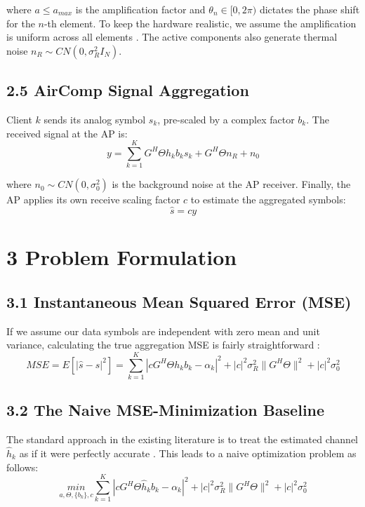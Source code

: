 \documentclass[10pt,twocolumn]{article}
\begin{document}
where $a\leq a_{max}$ is the amplification factor and $\theta _{n}\in [0,2\pi )$ dictates the phase shift for the $n$-th element. To keep the hardware realistic, we assume the amplification is uniform across all elements  \parencite{guangxu_zhu_8807c15e}. The active components also generate thermal noise $n_{R}\sim CN(0,\sigma _{R}^{2}I_{N})$.
\subsection{2.5	AirComp Signal Aggregation}

Client $k$ sends its analog symbol $s_{k}$, pre-scaled by a complex factor $b_{k}$. The received signal at the AP is:
\begin{displaymath}
y=\sum_{k=1}^{K} G^{H}\Theta h_{k}b_{k}s_{k}+G^{H}\Theta n_{R}+n_{0}
\end{displaymath}


where $n_{0}\sim CN(0,\sigma _{0}^{2})$ is the background noise at the AP receiver. Finally, the AP applies its own receive scaling factor $c$ to estimate the aggregated symbols:
\begin{displaymath}
\hat{s}=cy
\end{displaymath}

\section{3	Problem Formulation}
\subsection{3.1	Instantaneous Mean Squared Error (MSE)}

If we assume our data symbols are independent with zero mean and unit variance, calculating the true aggregation MSE is fairly straightforward  \parencite{wanchun_liu_04bb0ec1}:
\begin{displaymath}
MSE=E[|\hat{s}-s|^{2}]=\sum_{k=1}^{K} |cG^{H}\Theta h_{k}b_{k}-\alpha _{k}|^{2}+|c|^{2}\sigma _{R}^{2}∥G^{H}\Theta ∥^{2}+|c|^{2}\sigma _{0}^{2}
\end{displaymath}

\subsection{3.2	The Naive MSE-Minimization Baseline}

The standard approach in the existing literature is to treat the estimated channel $\hat{h}_{k}$ as if it were perfectly accurate  \parencite{mohammad_al_quraan_e9e152ba}. This leads to a naive optimization problem as follows:
\begin{displaymath}
\underset{a,\Theta ,\{b_{k}\},c}{min} \sum_{k=1}^{K} |cG^{H}\Theta \hat{h}_{k}b_{k}-\alpha _{k}|^{2}+|c|^{2}\sigma _{R}^{2}∥G^{H}\Theta ∥^{2}+|c|^{2}\sigma _{0}^{2}
\end{displaymath}
\end{document}
